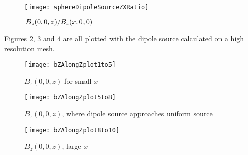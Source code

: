 \documentclass[11pt]{article}
\begin{document}
\begin{figure}[htp]
	\centering
	\texttt{[image: sphereDipoleSourceZXRatio]}
	\caption{$\flatfrac{B_z(0, 0, z)}{B_z(x, 0, 0)}$ \label{fig:dipoleSourceAnisotropy}}
\end{figure}

Figures \ref{fig:bZZplotx1to5}, \ref{fig:bZZplotx5to8} and \ref{fig:bZZplotx8to10} are all plotted with the dipole
source calculated on a high resolution mesh.

\begin{figure}[htp]
	\centering
	\texttt{[image: bZAlongZplot1to5]}
	\caption{$B_z(0, 0, z)$ for small $x$ \label{fig:bZZplotx1to5}}
\end{figure}

\begin{figure}[htp]
	\centering
	\texttt{[image: bZAlongZplot5to8]}
	\caption{$B_z(0, 0, z)$, where dipole source approaches uniform source \label{fig:bZZplotx5to8}}
\end{figure}

\begin{figure}[htp]
	\centering
	\texttt{[image: bZAlongZplot8to10]}
	\caption{$B_z(0, 0, z)$, large $x$ \label{fig:bZZplotx8to10}}
\end{figure}
\end{document}
